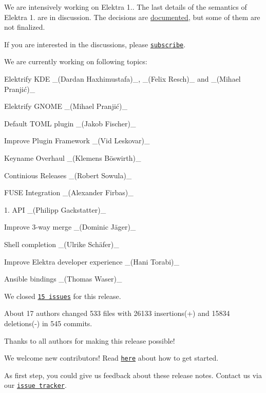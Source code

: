We are intensively working on Elektra 1.. The last details of the semantics of Elektra 1. are in discussion. The decisions are \hyperlink{doc_decisions_README_md}{documented}, but some of them are not finalized.

If you are interested in the discussions, please \href{https://issues.libelektra.org/3520}{\tt subscribe}.

We are currently working on following topics\+:


\begin{DoxyItemize}
\item Elektrify K\+DE \+\_\+(\+Dardan Haxhimustafa)\+\_\+, \+\_\+(\+Felix Resch)\+\_\+ and \+\_\+(Mihael Pranjić)\+\_\+
\item Elektrify G\+N\+O\+ME \+\_\+(Mihael Pranjić)\+\_\+
\item Default T\+O\+ML plugin \+\_\+(\+Jakob Fischer)\+\_\+
\item Improve Plugin Framework \+\_\+(\+Vid Leskovar)\+\_\+
\item Keyname Overhaul \+\_\+(Klemens Böswirth)\+\_\+
\item Continious Releases \+\_\+(\+Robert Sowula)\+\_\+
\item F\+U\+SE Integration \+\_\+(\+Alexander Firbas)\+\_\+
\item 1. A\+PI \+\_\+(\+Philipp Gackstatter)\+\_\+
\item Improve 3-\/way merge \+\_\+(Dominic Jäger)\+\_\+
\item Shell completion \+\_\+(Ulrike Schäfer)\+\_\+
\item Improve Elektra developer experience \+\_\+(\+Hani Torabi)\+\_\+
\item Ansible bindings \+\_\+(\+Thomas Waser)\+\_\+
\end{DoxyItemize}

We closed \href{https://github.com/ElektraInitiative/libelektra/milestone/24?closed=1}{\tt 15 issues} for this release.

About 17 authors changed 533 files with 26133 insertions(+) and 15834 deletions(-\/) in 545 commits.

Thanks to all authors for making this release possible!

We welcome new contributors! Read \href{https://www.libelektra.org/devgettingstarted/ideas}{\tt here} about how to get started.

As first step, you could give us feedback about these release notes. Contact us via our \href{https://issues.libelektra.org}{\tt issue tracker}.

